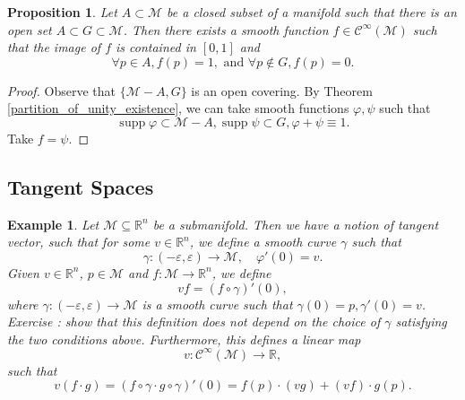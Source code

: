 \documentclass[10pt]{article}
\newtheorem{proposition}{Proposition}[section]
\newtheorem{example}{Example}[section]
\DeclareMathOperator{\supp}{supp}
\newcommand{\R}[0]{\mathbb{R}}
\begin{document}
\begin{proposition}
  Let $A\subset\mathcal{M}$ be a closed subset of a manifold such that there is an open set $A\subset G\subset \mathcal{M}$. Then there exists a smooth function $f\in\mathcal{C}^\infty(\mathcal{M})$ such that the image of $f$ is contained in $[0,1]$ and
  \begin{equation*}
    \forall p\in A, f(p) = 1,\text{ and }\forall p\not\in G, f(p) = 0.
  \end{equation*}
\end{proposition}

\begin{proof}
Observe that $\{\mathcal{M}-A,G\}$ is an open covering. By Theorem \ref{partition_of_unity_existence}, we can take smooth functions $\varphi,\psi$ such that 
\begin{equation*}
  \supp\varphi\subset\mathcal{M}-A,\supp\psi\subset G, \varphi+\psi \equiv 1.
\end{equation*}
Take $f = \psi$.
\end{proof}
\subsection{Tangent Spaces}
\begin{example}
  Let $\mathcal{M}\subseteq\R^n$ be a submanifold. Then we have a notion of tangent vector, such that for some $v\in\R^n$, we define a smooth curve $\gamma$ such that 
  \begin{equation*}
    \gamma:(-\varepsilon,\varepsilon)\to\mathcal{M},\quad \varphi'(0) = v.
  \end{equation*}
  Given $v\in\R^n$, $p\in\mathcal{M}$ and $f:\mathcal{M}\to\R^n$, we define 
  \begin{equation*}
    vf = (f\circ \gamma)'(0),
  \end{equation*}
  where $\gamma:(-\varepsilon,\varepsilon)\to\mathcal{M}$ is a smooth curve such that $\gamma(0)=p,\gamma'(0)= v$. 
  Exercise : show that this definition does not depend on the choice of $\gamma$ satisfying the two conditions above. Furthermore, this defines a linear map 
  \begin{equation*}
    v:\mathcal{C}^\infty(\mathcal{M})\to\R,
  \end{equation*}
  such that 
  \begin{equation*}
    v(f\cdot g) = (f\circ\gamma\cdot g\circ\gamma)'(0) = f(p)\cdot (vg)+(vf)\cdot g(p).
  \end{equation*}
\end{example}
\end{document}
